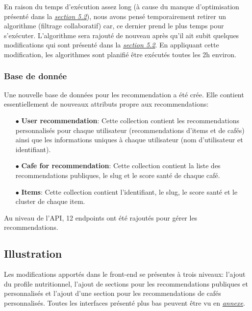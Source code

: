 \documentclass[11pt]{article}
\begin{document}
En raison du temps d'exécution assez long (à cause du manque d'optimisation présenté dans la \hyperref[discussion]{\textit{section 5.2}}), nous avons pensé temporairement retirer un algorithme (filtrage collaboratif) car, ce dernier prend le plus temps pour s'exécuter. L'algorithme sera rajouté de nouveau après qu'il ait subit quelques modifications qui sont présenté dans la \hyperref[discussion]{\textit{section 5.2}}. En appliquant cette modification, les algorithmes sont planifié être exécutés toutes les 2h environ.

\subsubsection{Base de donnée}
Une nouvelle base de données pour les recommendation a été crée. Elle contient essentiellement de nouveaux attributs propre aux recommendations:\\

\begin{itemize}
	\item[$\bullet$] \textbf{User recommendation}: Cette collection contient les recommendations personnalisés pour chaque utilisateur (recommendations d'items et de cafés) ainsi que les informations uniques à chaque utilisateur (nom d'utilisateur et identifiant).\\
	
	\item[$\bullet$] \textbf{Cafe for recommendation}: Cette collection contient la liste des recommendations publiques, le slug et le score santé de chaque café.\\
	
	\item[$\bullet$] \textbf{Items}: Cette collection contient l'identifiant, le slug, le score santé et le cluster de chaque item.\\
\end{itemize}

Au niveau de l'API, 12 endpoints ont été rajoutés pour gérer les recommendations.

\subsection{Illustration}
Les modifications apportés dans le front-end se présentes à trois niveaux: l'ajout du profile nutritionnel, l'ajout de sections pour les recommendations publiques et personnalisés et l'ajout d'une section pour les recommendations de cafés personnalisés. Toutes les interfaces présenté plus bas peuvent être vu en \hyperref[images]{\textit{annexe}}.\\
\end{document}
